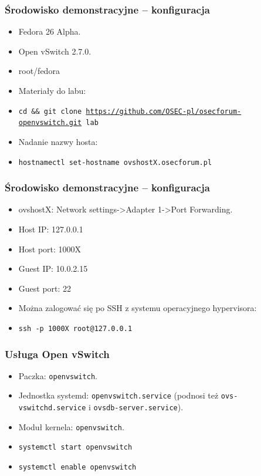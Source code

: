 \documentclass[dvipsnames,table]{beamer}
\begin{document}
\begin{frame}
\frametitle{Środowisko demonstracyjne -- konfiguracja}
\begin{itemize}
	\item Fedora 26 Alpha.
	\item Open vSwitch 2.7.0.
	\item root/fedora
	\item Materiały do labu:
	\item {\tt cd \&\& git clone \href{https://github.com/OSEC-pl/osecforum-openvswitch.git}{https://github.com/OSEC-pl/osecforum-openvswitch.git} lab}
	\item Nadanie nazwy hosta:
	\item {\tt hostnamectl set-hostname ovshostX.osecforum.pl}
\end{itemize}
\end{frame}

\begin{frame}
\frametitle{Środowisko demonstracyjne -- konfiguracja}
\begin{itemize}
	\item ovshostX: Network settings->Adapter 1->Port Forwarding.
	\item Host IP: 127.0.0.1
	\item Host port: 1000X
	\item Guest IP: 10.0.2.15
	\item Guest port: 22
	\item Można zalogować się po SSH z systemu operacyjnego hypervisora:
	\item {\tt ssh -p 1000X root@127.0.0.1}
\end{itemize}
\end{frame}

\begin{frame}
\frametitle{Usługa Open vSwitch}
\begin{itemize}
	\item Paczka: {\tt openvswitch}.
	\item Jednostka systemd: {\tt openvswitch.service} (podnosi też {\tt ovs-vswitchd.service} i {\tt ovsdb-server.service}).
	\item Moduł kernela: {\tt openvswitch}.
	\item {\tt systemctl start openvswitch}
	\item {\tt systemctl enable openvswitch}

\end{itemize}
\end{frame}
\end{document}
